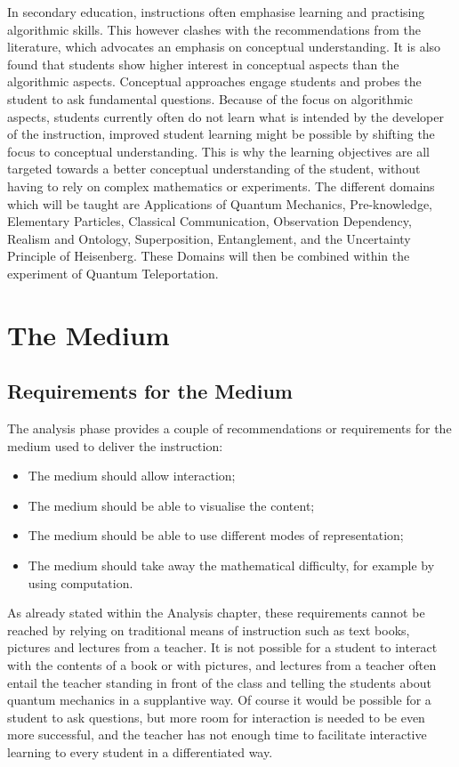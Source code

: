 \documentclass[11pt,twoside]{report} %
\begin{document}
In secondary education, instructions often emphasise learning and practising algorithmic skills. This however clashes with the recommendations from the literature, which advocates an emphasis on conceptual understanding. It is also found that students show higher interest in conceptual aspects than the algorithmic aspects. Conceptual approaches engage students and probes the student to ask fundamental questions. Because of the focus on algorithmic aspects, students currently often do not learn what is intended by the developer of the instruction, improved student learning might be possible by shifting the focus to conceptual understanding. This is why the learning objectives are all targeted towards a better conceptual understanding of the student, without having to rely on complex mathematics or experiments. The different domains which will be taught are Applications of Quantum Mechanics, Pre-knowledge, Elementary Particles, Classical Communication, Observation Dependency, Realism and Ontology, Superposition, Entanglement, and the Uncertainty Principle of Heisenberg. These Domains will then be combined within the experiment of Quantum Teleportation.

\section{The Medium}

\subsection{Requirements for the Medium}

The analysis phase provides a couple of recommendations or requirements for the medium used to deliver the instruction:

\begin{itemize}
\item The medium should allow interaction;
\item The medium should be able to visualise the content;
\item The medium should be able to use different modes of representation;
\item The medium should take away the mathematical difficulty, for example by using computation.
\end{itemize}

As already stated within the Analysis chapter, these requirements cannot be reached by relying on traditional means of instruction such as text books, pictures and lectures from a teacher. It is not possible for a student to interact with the contents of a book or with pictures, and lectures from a teacher often entail the teacher standing in front of the class and telling the students about quantum mechanics in a supplantive way. Of course it would be possible for a student to ask questions, but more room for interaction is needed to be even more successful, and the teacher has not enough time to facilitate interactive learning to every student in a differentiated way.
\end{document}

